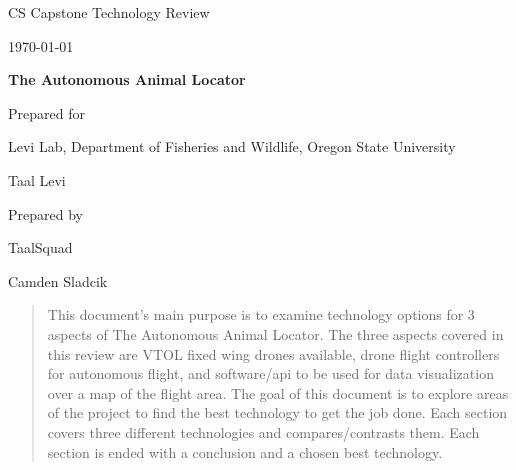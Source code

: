 \documentclass[onecolumn, 10pt, compsoc]{IEEEtran}
\def \CapstoneTeamName{		TaalSquad}
\def \CapstoneProjectName{		The Autonomous Animal Locator}
\def \CapstoneSponsorCompany{	Levi Lab, Department of Fisheries and Wildlife, Oregon State University}
\def \CapstoneSponsorPerson{		Taal Levi}
\def \GroupMemberOne{			Camden Sladcik}
\def \DocType{	%
				Technology Review
				}
\newcommand{\NameSigPair}[1]{\par
\makebox[2.75in][r]{#1} \hfil 	\makebox[3.25in]{\makebox[2.25in]{\hrulefill} \hfill		\makebox[.75in]{\hrulefill}}
\par\vspace{-12pt} \textit{\tiny\noindent
\makebox[2.75in]{} \hfil		\makebox[3.25in]{\makebox[2.25in][r]{Signature} \hfill	\makebox[.75in][r]{Date}}}}
\renewcommand{\NameSigPair}[1]{#1}
\begin{document}
\begin{titlepage}
    \begin{singlespace}
        \hfill 
        \par\vspace{.2in}
        \centering
        \scshape{
            \huge CS Capstone \DocType \par
            {\large\today}\par
            \vspace{.5in}
            \textbf{\Huge\CapstoneProjectName}\par
            \vfill
            {\large Prepared for}\par
            \Huge \CapstoneSponsorCompany\par
            \vspace{5pt}
            {\Large\NameSigPair{\CapstoneSponsorPerson}\par}
            {\large Prepared by }\par
            \CapstoneTeamName\par 
            \vspace{5pt}
            {\Large
                \NameSigPair{\GroupMemberOne}\par
            }
            \vspace{20pt}
        }
        \begin{abstract}
        This document's main purpose is to examine technology options for 3 aspects of The Autonomous Animal Locator. The three aspects covered in this review are VTOL fixed wing drones available, drone flight controllers for autonomous flight, and software/api to be used for data visualization over a map of the flight area. The goal of this document is to explore areas of the project to find the best technology to get the job done. Each section covers three different technologies and compares/contrasts them. Each section is ended with a conclusion and a chosen best technology.
        \end{abstract}     
    \end{singlespace}
\end{titlepage}
\newpage
{}
\tableofcontents
\clearpage

\end{document}
